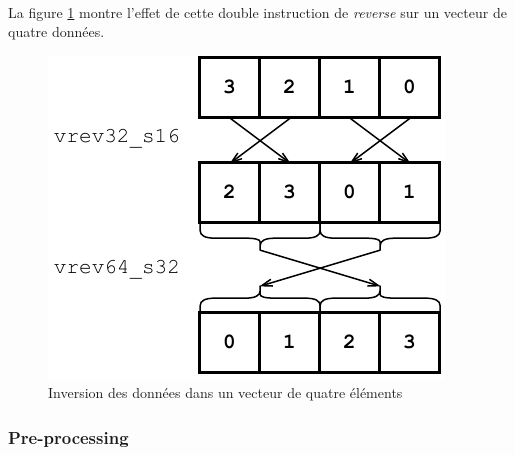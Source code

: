 \documentclass{article}
\begin{document}
    \paragraph{}
    La figure \ref{fig:double-reverse} montre l'effet de cette double instruction de \emph{reverse} sur un vecteur de quatre données. %
    \begin{figure}[H]
        \centering
        \includegraphics[width=.3\linewidth]{./images/double-reverse.pdf}
        \caption{Inversion des données dans un vecteur de quatre éléments}
        \label{fig:double-reverse}
    \end{figure}


    \subsubsection{Pre-processing}
\end{document}
